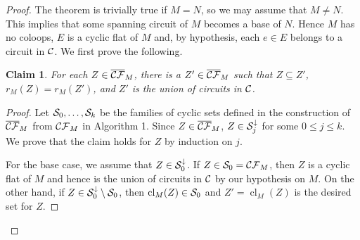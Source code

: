 \documentclass{daj}
\newtheorem{claim}[thm]{Claim}\theoremstyle{plain}
\DeclareMathOperator{\cl}{cl}
\begin{document}
\begin{proof}
The theorem is trivially true if $M=N$, so we may assume that $M\neq N$. This implies that some spanning circuit of $M$ becomes a base of $N$. Hence $M$ has no coloops,  $E$ is a cyclic flat of $M$ and, by hypothesis, each $e\in E$ belongs to a circuit in $\cal C$. 
%
We first prove the following.

\begin{claim}
\label{claim:cover}
For each $Z\in \overline{\cal CF}_M$, there is a $Z'\in \overline{\cal CF}_M$ such that $Z\subseteq Z'$, $r_{M}(Z)=r_{M}(Z')$, and $Z'$ is the union of circuits in  ${\cal C}$.
\end{claim}

\begin{proof}
Let ${\cal S}_0, \dots, {\cal S}_k$ be the families of cyclic sets defined in the construction of $\overline{\cal CF}_M$ from  ${\cal CF}_M$ in Algorithm 1. 
Since $Z\in \overline{\cal CF}_M$, $Z\in {\cal S}_j^{\downarrow}$ for some $0\leq j\leq k$. We prove that the claim holds for $Z$ by induction on $j$.


For the  base case, we assume that $Z\in {\cal S}_0^{\downarrow}$.
If $Z\in {\cal S}_0={\cal CF}_M$, then
$Z$ is a cyclic flat of $M$ and hence
is the union of circuits in ${\cal C}$ by our hypothesis on $M$. On the other hand, if $Z\in {\cal S}_0^{\downarrow}\setminus {\cal S}_0$, then 
$\cl_{M}(Z)\in {\cal S}_0$ 
and $Z'=\cl_{M}(Z)$ is the desired set for $Z$.


\end{proof}
\end{proof}
\end{document}
